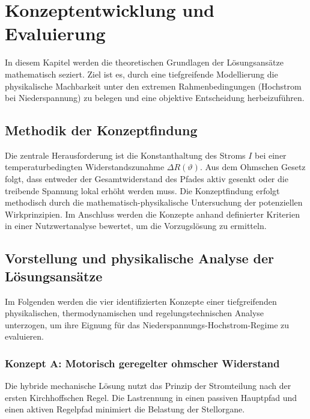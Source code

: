 
\section{Konzeptentwicklung und Evaluierung}
\label{chap:konzeptentwicklung}

In diesem Kapitel werden die theoretischen Grundlagen der Lösungsansätze mathematisch seziert. Ziel ist es, durch eine tiefgreifende Modellierung die physikalische Machbarkeit unter den extremen Rahmenbedingungen (Hochstrom bei Niederspannung) zu belegen und eine objektive Entscheidung herbeizuführen.

\subsection{Methodik der Konzeptfindung}
\label{sec:methodik}

Die zentrale Herausforderung ist die Konstanthaltung des Stroms $I$ bei einer temperaturbedingten Widerstandszunahme $\Delta R(\vartheta)$. Aus dem Ohmschen Gesetz folgt, dass entweder der Gesamtwiderstand des Pfades aktiv gesenkt oder die treibende Spannung lokal erhöht werden muss.
Die Konzeptfindung erfolgt methodisch durch die mathematisch-physikalische Untersuchung der potenziellen Wirkprinzipien. Im Anschluss werden die Konzepte anhand definierter Kriterien in einer Nutzwertanalyse bewertet, um die Vorzugslösung zu ermitteln.

\subsection{Vorstellung und physikalische Analyse der Lösungsansätze}
\label{sec:vorstellung_loesungsansaetze}

Im Folgenden werden die vier identifizierten Konzepte einer tiefgreifenden physikalischen, thermodynamischen und regelungstechnischen Analyse unterzogen, um ihre Eignung für das Niederspannungs-Hochstrom-Regime zu evaluieren.

\subsubsection{Konzept A: Motorisch geregelter ohmscher Widerstand}

Die hybride mechanische Lösung nutzt das Prinzip der Stromteilung nach der ersten Kirchhoffschen Regel. Die Lastrennung in einen passiven Hauptpfad und einen aktiven Regelpfad minimiert die Belastung der Stellorgane.

